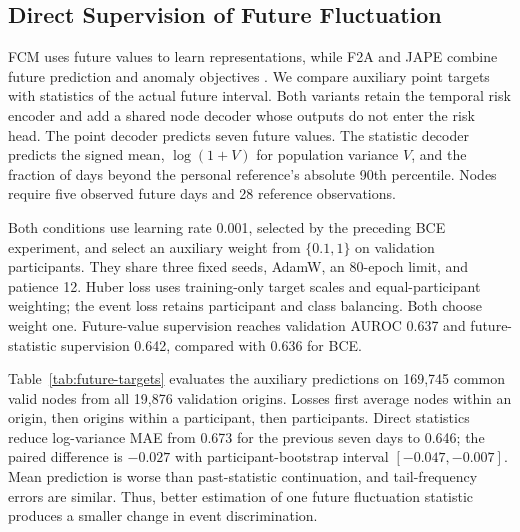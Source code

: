 \subsection{Direct Supervision of Future Fluctuation}
FCM uses future values to learn representations, while F2A and JAPE combine future prediction and anomaly objectives \citep{hneH01,hneP01,hneP02}. We compare auxiliary point targets with statistics of the actual future interval. Both variants retain the temporal risk encoder and add a shared node decoder whose outputs do not enter the risk head. The point decoder predicts seven future values. The statistic decoder predicts the signed mean, $\log(1+V)$ for population variance $V$, and the fraction of days beyond the personal reference's absolute 90th percentile. Nodes require five observed future days and 28 reference observations.

Both conditions use learning rate 0.001, selected by the preceding BCE experiment, and select an auxiliary weight from $\{0.1,1\}$ on validation participants. They share three fixed seeds, AdamW, an 80-epoch limit, and patience 12. Huber loss uses training-only target scales and equal-participant weighting; the event loss retains participant and class balancing. Both choose weight one. Future-value supervision reaches validation AUROC 0.637 and future-statistic supervision 0.642, compared with 0.636 for BCE.

Table~\ref{tab:future-targets} evaluates the auxiliary predictions on 169,745 common valid nodes from all 19,876 validation origins. Losses first average nodes within an origin, then origins within a participant, then participants. Direct statistics reduce log-variance MAE from 0.673 for the previous seven days to 0.646; the paired difference is $-0.027$ with participant-bootstrap interval $[-0.047,-0.007]$. Mean prediction is worse than past-statistic continuation, and tail-frequency errors are similar. Thus, better estimation of one future fluctuation statistic produces a smaller change in event discrimination.

\begin{table}[t]
\centering
\caption{College validation development on 19,876 origins. Neural entries average three seeds.}
\label{tab:college-learning}
\small\setlength{\tabcolsep}{5pt}

\end{table}

\begin{table}[t]
\centering
\caption{Temporal input scaling: three-seed, five-fold development AUROC on identical origins.}
\label{tab:reference-units}
\small\setlength{\tabcolsep}{4pt}

\end{table}

\begin{table}[ht]
\centering
\caption{College validation future-target errors. The first three columns are MAE; Huber uses training-standardized targets.}
\label{tab:future-targets}
\small\setlength{\tabcolsep}{3pt}

\end{table}
